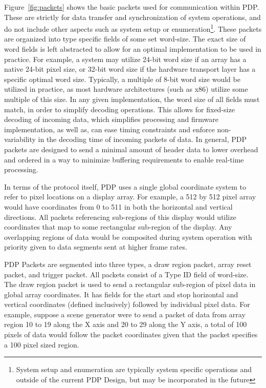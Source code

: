 Figure~\ref{fig:packets} shows the basic packets used for communication within PDP. These are strictly for data transfer and synchronization of system operations, and do not include other aspects such as system setup or enumeration\footnote{System setup and enumeration are typically system specific operations and outside of the current PDP Design, but may be incorporated in the future}. These packets are organized into type specific fields of some set word-size. The exact size of word fields is left abstracted to allow for an optimal implementation to be used in practice. For example, a system may utilize 24-bit word size if an array has a native 24-bit pixel size, or 32-bit word size if the hardware transport layer has a specific optimal word size. Typically, a multiple of 8-bit word size would be utilized in practice, as most hardware architectures (such as x86) utilize some multiple of this size. In any given implementation, the word size of all fields must match, in order to simplify decoding operations. This allows for fixed-size decoding of incoming data, which simplifies processing and firmware implementation, as well as, can ease timing constraints and enforce non-variability in the decoding time of incoming packets of data. In general, PDP packets are designed to send a minimal amount of header data to lower overhead and ordered in a way to minimize buffering requirements to enable real-time processing.

In terms of the protocol itself, PDP uses a single global coordinate system to refer to pixel locations on a display array. For example, a 512 by 512 pixel array would have coordinates from 0 to 511 in both the horizontal and vertical directions. All packets referencing sub-regions of this display would utilize coordinates that map to some rectangular sub-region of the display. Any overlapping regions of data would be composited during system operation with priority given to data segments sent at higher frame rates.

PDP Packets are segmented into three types, a draw region packet, array reset packet, and trigger packet. All packets consist of a Type ID field of word-size. The draw region packet is used to send a rectangular sub-region of pixel data in global array coordinates. It has fields for the start and stop horizontal and vertical coordinates (defined inclusively) followed by individual pixel data. For example, suppose a scene generator were to send a packet of data from array region 10 to 19 along the X axis and 20 to 29 along the Y axis, a total of 100 pixels of data would follow the packet coordinates given that the packet specifies a 100 pixel sized region.


